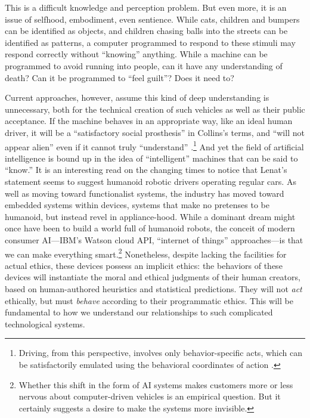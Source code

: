 This is a difficult knowledge and perception problem. But even more,
it is an issue of selfhood, embodiment, even sentience. While cats,
children and bumpers can be identified as objects, and children
chasing balls into the streets can be identified as patterns, a
computer programmed to respond to these stimuli may respond correctly
without ``knowing'' anything. While a machine can be programmed to avoid
running into people, can it have any understanding of death? Can it be
programmed to ``feel guilt''? Does it need to?





Current approaches, however, assume this kind of deep understanding is
unnecessary, both for the technical creation of such vehicles as well
as their public acceptance. If the machine behaves in an appropriate
way, like an ideal human driver, it will be a ``satisfactory social
prosthesis'' in Collins's terms, and ``will not appear alien'' even if
it cannot truly ``understand'' \cite[p. 31]{Collins}.\footnote{Driving, from
this perspective, involves only behavior-specific acts, which can be
satisfactorily emulated using the behavioral coordinates of
action \cite[p. 33--37]{Collins}.} And yet the field of artificial
intelligence is bound up in the idea 
of ``intelligent'' machines that can be said to ``know.'' It is an
interesting read on the changing 
times to notice that Lenat's statement seems to suggest humanoid
robotic drivers operating regular cars. As well as moving toward
functionalist systems, the industry has moved toward embedded systems
within devices, systems that make no pretenses to be humanoid, but
instead revel in appliance-hood. While a dominant dream might once have been
to build a world full of humanoid robots, the conceit of modern
consumer AI---IBM's Watson cloud API, ``internet of things''
approaches---is that we can make everything smart.\footnote{Whether this shift
in the form of AI 
systems makes customers more or less nervous about computer-driven
vehicles is an empirical question. But it certainly suggests a desire
to make the systems more 
invisible.}
Nonetheless, despite lacking the facilities for actual ethics, these
devices possess an implicit ethics: the
behaviors of these devices will instantiate the moral and
ethical judgments of their human creators, based on
human-authored heuristics and statistical predictions. They will not
\emph{act} ethically, but must
\emph{behave} according to their programmatic ethics. This will be
fundamental to how we understand our relationships to such
complicated technological systems.

